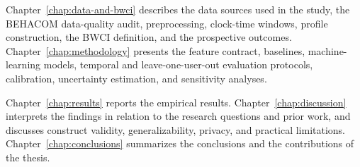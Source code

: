 Chapter~\ref{chap:data-and-bwci} describes the data sources used in the study,
the BEHACOM data-quality audit, preprocessing, clock-time windows, profile
construction, the BWCI definition, and the prospective outcomes.
Chapter~\ref{chap:methodology} presents the feature contract, baselines,
machine-learning models, temporal and leave-one-user-out evaluation protocols,
calibration, uncertainty estimation, and sensitivity analyses.

Chapter~\ref{chap:results} reports the empirical results.
Chapter~\ref{chap:discussion} interprets the findings in relation to the
research questions and prior work, and discusses construct validity,
generalizability, privacy, and practical limitations.
Chapter~\ref{chap:conclusions} summarizes the conclusions and the
contributions of the thesis.